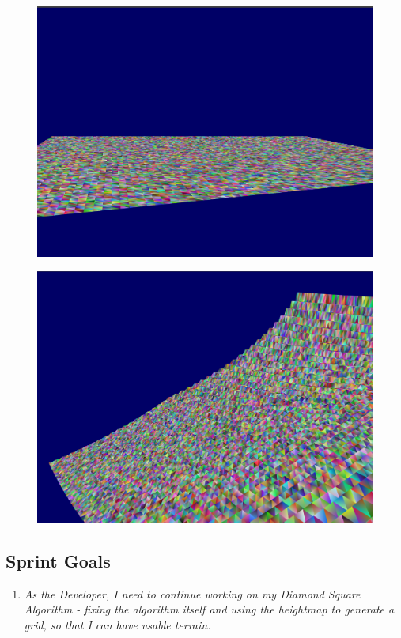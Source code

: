 \documentclass[a4paper,10pt]{report}
\begin{document}
\begin{figure}[h!]
\centering
\begin{minipage}{.5\textwidth}
  \centering
  \includegraphics[width=.9\linewidth]{Sprint3-2.png}
  \label{fig:sprint3-2}
\end{minipage}%
\begin{minipage}{.5\textwidth}
  \centering
  \includegraphics[width=.9\linewidth]{Sprint3-3.png}
  \label{fig:sprint3-3}
\end{minipage}
\end{figure}

\subsection{Sprint Goals}
\begin{enumerate}
    \item \textit{As the Developer, I need to continue working on my Diamond Square Algorithm - fixing the algorithm itself and using the heightmap to generate a grid, so that I can have usable terrain. }
\end{enumerate}
\end{document}
